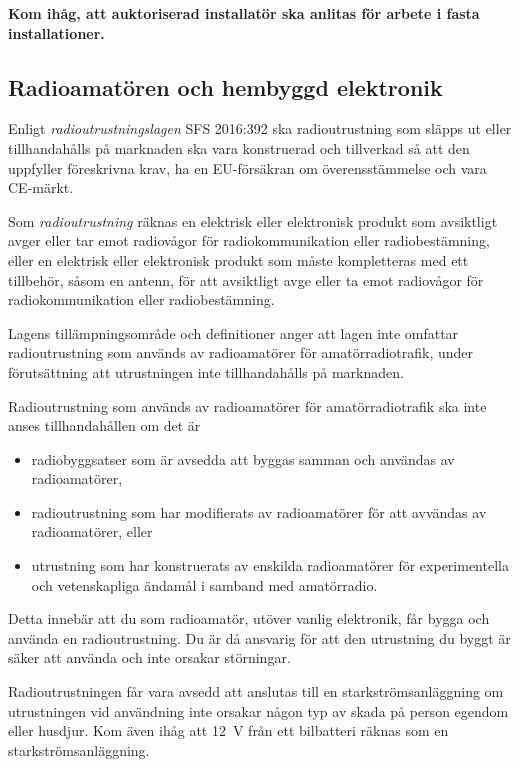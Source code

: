 \textbf{Kom ihåg, att auktoriserad installatör ska anlitas för arbete
i fasta installationer.}

\subsection{Radioamatören och hembyggd elektronik}

Enligt \emph{radioutrustningslagen} SFS 2016:392 \cite{SFS2016:392} ska radioutrustning som
släpps ut eller tillhandahålls på marknaden ska vara konstruerad och
tillverkad så att den uppfyller föreskrivna krav, ha en EU-försäkran om
överensstämmelse och vara CE-märkt.

Som \emph{radioutrustning} räknas en elektrisk eller elektronisk produkt som
avsiktligt avger eller tar emot radiovågor för radiokommunikation eller
radiobestämning, eller en elektrisk eller elektronisk produkt som måste
kompletteras med ett tillbehör, såsom en antenn, för att avsiktligt avge
eller ta emot radiovågor för radiokommunikation eller radiobestämning.

Lagens tillämpningsområde och definitioner anger att lagen inte omfattar
radioutrustning som används av radioamatörer för amatörradiotrafik, under
förutsättning att utrustningen inte tillhandahålls på marknaden.

Radioutrustning som används av radioamatörer för amatörradiotrafik ska inte
anses tillhandahållen om det är
\begin{itemize}
	\item radiobyggsatser som är avsedda att byggas samman och användas av
	radioamatörer,
	\item radioutrustning som har modifierats av radioamatörer för att
	avvändas av radioamatörer, eller
	\item utrustning som har konstruerats av enskilda radioamatörer för
	experimentella och vetenskapliga ändamål i samband med amatörradio.
\end{itemize}

Detta innebär att du som radioamatör, utöver vanlig elektronik, får bygga
och använda en radioutrustning. Du är då ansvarig för att den utrustning du
byggt är säker att använda och inte orsakar störningar.

Radioutrustningen får vara avsedd att anslutas till en starkströmsanläggning
om utrustningen vid användning inte orsakar någon typ av skada på person
egendom eller husdjur. Kom även ihåg att 12~V från ett bilbatteri räknas
som en starkströmsanläggning.

